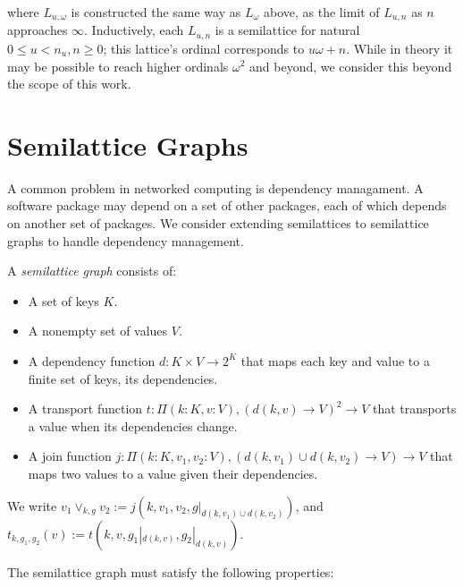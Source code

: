 \documentclass{article}
\begin{document}
      where $L_{u, \omega}$ is constructed the same way as $L_{\omega}$ above, as the limit of $L_{u, n}$ as $n$ approaches $\infty$. Inductively, each $L_{u, n}$ is a semilattice for natural $0 \leq u < n_u, n \geq 0$; this lattice's ordinal corresponds to $u \omega + n$. While in theory it may be possible to reach higher ordinals $\omega^2$ and beyond, we consider this beyond the scope of this work.

    \section{Semilattice Graphs}

        A common problem in networked computing is dependency managament. A software package may depend on a set of other packages, each of which depends on another set of packages. We consider extending semilattices to semilattice graphs to handle dependency management.
        
        A \emph{semilattice graph} consists of:

        \begin{itemize}
            \item A set of keys $K$.
            \item A nonempty set of values $V$.
            \item A dependency function $d : K \times V \rightarrow 2^K$ that maps each key and value to a finite set of keys, its dependencies.
            \item A transport function $t : \Pi (k : K, v : V), (d(k, v) \rightarrow V)^2 \rightarrow V$ that transports a value when its dependencies change.
            \item A join function $j : \Pi (k : K, v_1, v_2 : V), (d(k, v_1) \cup d(k, v_2) \rightarrow V) \rightarrow V$ that maps two values to a value given their dependencies.
        \end{itemize}

        We write $v_1 \vee_{k, g} v_2 := j(k, v_1, v_2, g|_{d(k, v_1) \cup d(k, v_2)})$, and $t_{k, g_1, g_2}(v) := t(k, v, g_1|_{d(k, v)}, g_2|_{d(k, v)})$.

        The semilattice graph must satisfy the following properties:
\end{document}
